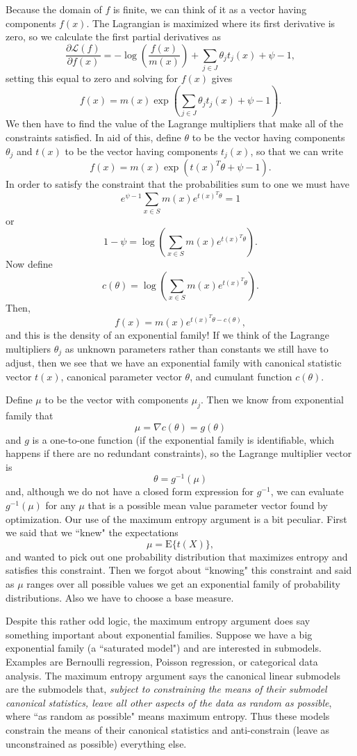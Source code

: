 \documentclass[12pt]{article}
\newcommand{\E}{\mathrm{E}}
\DeclareMathOperator{\E}{E}
\begin{document}
Because the domain of $f$ is finite, we can think of it as a vector having components $f(x)$. The Lagrangian is maximized where its first derivative is zero, so we calculate the first partial derivatives as
$$
\frac{\partial \mathcal{L}(f)}{\partial f(x)} = -\log\left(\frac{f(x)}{m(x)}\right) + \sum_{j\in J}\theta_j t_j(x) + \psi - 1,
$$
setting this equal to zero and solving for $f(x)$ gives 
$$
  f(x) = m(x)\exp\left(\sum_{j\in J}\theta_jt_j(x) + \psi - 1\right).
$$
We then have to find the value of the Lagrange multipliers that make all of the constraints satisfied. In aid of this, define $\theta$ to be the vector having components $\theta_j$ and $t(x)$ to be the vector having components $t_j(x)$, so that we can write
$$
  f(x) = m(x)\exp\left(t(x)^T\theta + \psi - 1\right).
$$
In order to satisfy the constraint that the probabilities sum to one we must
have
$$
  e^{\psi - 1}\sum_{x\in S}m(x)e^{t(x)^T\theta} = 1
$$
or
$$
  1 - \psi = \log\left(\sum_{x\in S}m(x)e^{t(x)^T\theta}\right).
$$
Now define
$$
  c(\theta) = \log\left(\sum_{x\in S}m(x)e^{t(x)^T\theta}\right).
$$
Then,
$$
  f(x) = m(x)e^{t(x)^T\theta - c(\theta)},
$$
and this is the density of an exponential family! If we think of the Lagrange multipliers $\theta_j$ as unknown parameters rather than constants we still have to adjust, then we see that we have an exponential family with canonical statistic vector $t(x)$, canonical parameter vector $\theta$, and cumulant function $c(\theta)$.

Define $\mu$ to be the vector with components $\mu_j$. Then we know from exponential family that
$$
  \mu = \nabla c(\theta) = g(\theta)
$$
and $g$ is a one-to-one function (if the exponential family is identifiable, which happens if there are no redundant constraints), so the Lagrange multiplier vector is 
$$
  \theta = g^{-1}(\mu)
$$
and, although we do not have a closed form expression for $g^{-1}$, we can evaluate $g^{-1}(\mu)$ for any $\mu$ that is a possible mean value parameter vector found by optimization. Our use of the maximum entropy argument is a bit peculiar. First we said that we ``knew" the expectations
$$
  \mu = \E\{t(X)\},
$$
and wanted to pick out one probability distribution that maximizes entropy and satisfies this constraint. Then we forgot about ``knowing" this constraint and said as $\mu$ ranges over all possible values we get an exponential family of probability distributions. Also we have to choose a base measure.

Despite this rather odd logic, the maximum entropy argument does say something important about exponential families. Suppose we have a big exponential family (a ``saturated model") and are interested in submodels. Examples are Bernoulli regression, Poisson regression, or categorical data analysis. The maximum entropy argument says the canonical linear submodels are the submodels that, \emph{subject to constraining the means of their submodel canonical statistics, leave all other aspects of the data as random as possible}, where ``as random as possible" means maximum entropy. Thus these models constrain the means of their canonical statistics and anti-constrain (leave as unconstrained as possible) everything else.
\end{document}
